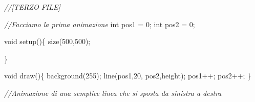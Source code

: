 \documentclass[
]{article}
\newenvironment{Shaded}{}{}
\newcommand{\CommentTok}[1]{\textcolor[rgb]{0.38,0.63,0.69}{\textit{#1}}}
\newcommand{\DataTypeTok}[1]{\textcolor[rgb]{0.56,0.13,0.00}{#1}}
\newcommand{\DecValTok}[1]{\textcolor[rgb]{0.25,0.63,0.44}{#1}}
\newcommand{\FunctionTok}[1]{\textcolor[rgb]{0.02,0.16,0.49}{#1}}
\newcommand{\NormalTok}[1]{#1}
\newcommand{\OperatorTok}[1]{\textcolor[rgb]{0.40,0.40,0.40}{#1}}
\begin{document}
\begin{Shaded}
\begin{Highlighting}[]
\CommentTok{//[TERZO FILE]}

\CommentTok{//Facciamo la prima animazione}
\DataTypeTok{int}\NormalTok{ pos1 }\OperatorTok{=} \DecValTok{0}\OperatorTok{;}
\DataTypeTok{int}\NormalTok{ pos2 }\OperatorTok{=} \DecValTok{0}\OperatorTok{;}

\DataTypeTok{void} \FunctionTok{setup}\OperatorTok{()\{}
  \FunctionTok{size}\OperatorTok{(}\DecValTok{500}\OperatorTok{,}\DecValTok{500}\OperatorTok{);}

\OperatorTok{\}}


\DataTypeTok{void} \FunctionTok{draw}\OperatorTok{()\{}
  \FunctionTok{background}\OperatorTok{(}\DecValTok{255}\OperatorTok{);}
  \FunctionTok{line}\OperatorTok{(}\NormalTok{pos1}\OperatorTok{,}\DecValTok{20}\OperatorTok{,}\NormalTok{ pos2}\OperatorTok{,}\NormalTok{height}\OperatorTok{);}
\NormalTok{  pos1}\OperatorTok{++;}
\NormalTok{  pos2}\OperatorTok{++;}
\OperatorTok{\}}

\CommentTok{//Animazione di una semplice linea che si sposta da sinistra a destra}
\end{Highlighting}
\end{Shaded}
\end{document}
